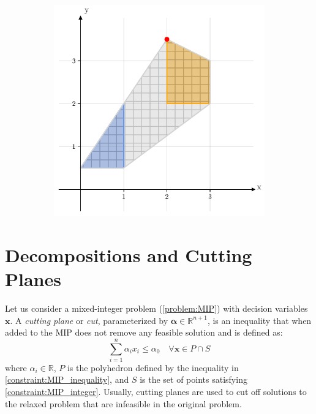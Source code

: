 \begin{figure}[H]
\begin{subfigure}{0.33\textwidth}
        \caption{}
    \end{subfigure}
    \begin{subfigure}{0.33\textwidth}
    \centering
        \includegraphics[width=0.95\linewidth]{Images/dp_convex_hull.pdf}
        \caption{}
    \end{subfigure}
\end{figure}

\section{Decompositions and Cutting Planes} \label{section:cuts}
Let us consider a mixed-integer problem (\cref{problem:MIP}) with decision variables $\mathbf x$. A \textit{cutting plane} or \textit{cut}, parameterized by $\boldsymbol \alpha \in \mathbb{R}^{n+1}$, is an inequality that when added to the MIP does not remove any feasible solution and is defined as: 
\begin{equation} \label{Eq:cuts}
    \sum_{i=1}^n \alpha_i x_i \leq \alpha_0 \quad  \forall \mathbf x \in P \cap S
\end{equation} 
 where $\alpha_i \in \mathbb{R}$, $P$ is the polyhedron defined by the inequality in \cref{constraint:MIP_inequality}, and $S$ is the set of points satisfying \cref{constraint:MIP_integer}. Usually, cutting planes are used to cut off solutions to the relaxed problem that are infeasible in the original problem. 

